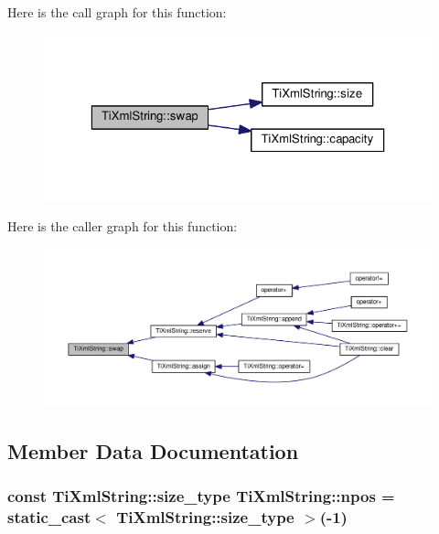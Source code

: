 Here is the call graph for this function\+:
\nopagebreak
\begin{figure}[H]
\begin{center}
\leavevmode
\includegraphics[width=323pt]{class_ti_xml_string_aa392cbc180752a79f007f4f9280c7762_cgraph}
\end{center}
\end{figure}




Here is the caller graph for this function\+:
\nopagebreak
\begin{figure}[H]
\begin{center}
\leavevmode
\includegraphics[width=350pt]{class_ti_xml_string_aa392cbc180752a79f007f4f9280c7762_icgraph}
\end{center}
\end{figure}




\subsection{Member Data Documentation}
\subsubsection[{\texorpdfstring{npos}{npos}}]{\setlength{\rightskip}{0pt plus 5cm}const {\bf Ti\+Xml\+String\+::size\+\_\+type} Ti\+Xml\+String\+::npos = static\+\_\+cast$<$ {\bf Ti\+Xml\+String\+::size\+\_\+type} $>$(-\/1)\hspace{0.3cm}{\ttfamily [static]}}\hypertarget{class_ti_xml_string_a8f4422d227088dc7bec96f479b275d0a}{}\label{class_ti_xml_string_a8f4422d227088dc7bec96f479b275d0a}


